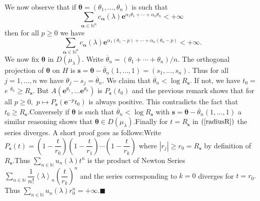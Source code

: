 \documentclass[a4paper,oneside,notitlepage]{article}%
\begin{document}
\begin{description}
We now observe that if \textbf{$\boldsymbol{\theta}$}$=\left(  \theta
_{1},\ldots,\theta_{n}\right)  $ is such that
\[%
{\displaystyle\sum\limits_{\mathbf{\boldsymbol{\alpha}}\in\mathbb{N}^{n}}}
c_{\mathbf{\boldsymbol{\alpha}}}\left(  \lambda\right)  \mathbf{e}^{\alpha
_{1}\theta_{1}+\cdots+\alpha_{n}\theta_{n}}<+\infty
\]
\newline then for all $p\geqslant0$ we have
\[%
{\displaystyle\sum\limits_{\mathbf{\boldsymbol{\alpha}}\in\mathbb{N}^{n}}}
c_{\mathbf{\boldsymbol{\alpha}}}\left(  \lambda\right)  \mathbf{e}^{\alpha
_{1}\left(  \theta_{1}-p\right)  +\cdots+\alpha_{n}\left(  \theta
_{n}-p\right)  }<+\infty.
\]
\newline We now fix $\boldsymbol{\theta}$ in $D\left(  \mu_{\lambda}\right)
.$ Write $\overline{\theta}_{n}=\left(  \theta_{1}+\cdots+\theta_{n}\right)
/n.$ The orthogonal projection of $\boldsymbol{\theta}$ on $H$ is
$\mathbf{s}=\boldsymbol{\theta}-\overline{\theta}_{n}\left(  1,\ldots
,1\right)  =\left(  s_{1},\ldots,s_{n}\right)  $. Thus for all $j=1,\ldots,n$
we have $\theta_{j}-s_{j}=\overline{\theta}_{n}.$ We claim that $\overline
{\theta}_{n}<\log R_{\mathbf{s}}.$ If not, we have $t_{0}=$\textbf{$e$%
}$^{\overline{\theta}_{n}}\geqslant R_{\mathbf{s}}$. But $A\left(
\mathbf{e}^{\theta_{1}},\ldots\mathbf{e}^{\theta_{n}}\right)  $ is
$P_{\mathbf{s}}\left(  t_{0}\right)  $ and the previous remark shows that for
all $p\geqslant0,$ $p\mapsto P_{\mathbf{s}}\left(  \mathbf{e}^{-p}%
t_{0}\right)  $ is always positive. This contradicts the fact that
$t_{0}\geqslant R_{\mathbf{s}}$.\newline Conversely if $\boldsymbol{\theta}$
is such that $\overline{\theta}_{n}<\log R_{\mathbf{s}}$ with $\mathbf{s}%
=\boldsymbol{\theta}-\overline{\theta}_{n}\left(  1,\ldots,1\right)  $ a
similar reasoning shows that $\boldsymbol{\theta}\in D\left(  \mu_{\lambda
}\right)  .$\newline Finally for $t=R_{\mathbf{s}}$ in $\left(  \ref{radiusR}%
\right)  $ the series diverges. A short proof goes as follows:\newline Write
$P_{\mathbf{s}}\left(  t\right)  =\left(  1-\dfrac{t}{r_{0}}\right)  \left(
1-\dfrac{t}{r_{1}}\right)  \cdots\left(  1-\dfrac{t}{r_{k}}\right)  $ where
$\left\vert r_{j}\right\vert \geqslant r_{0}=R_{\mathbf{s}}$ by definition of
$R_{\mathbf{s}}.$\newline Thus $%
{\displaystyle\sum\limits_{n\in\mathbb{N}}}
u_{n}\left(  \lambda\right)  t^{n}$ is the product of Newton Series $%
{\displaystyle\sum\limits_{n\in\mathbb{N}}}
\dfrac{1}{n!}\left\langle \lambda\right\rangle _{n}\left(  \dfrac{t}{r_{k}%
}\right)  ^{n}$ and the series corresponding to $k=0$ diverges for $t=r_{0}.$
Thus $%
{\displaystyle\sum\limits_{n\in\mathbb{N}}}
u_{n}\left(  \lambda\right)  r_{0}^{n}=+\infty.\blacksquare$


\end{description}
\end{document}
